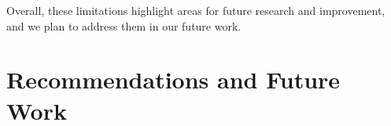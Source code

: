 Overall, these limitations highlight areas for future research and improvement, and we plan to address them in our future work.

\section{Recommendations and Future Work}





